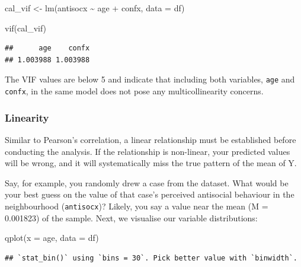\documentclass[
]{book}
\newenvironment{Shaded}{\begin{snugshade}}{\end{snugshade}}
\newcommand{\AttributeTok}[1]{\textcolor[rgb]{0.77,0.63,0.00}{#1}}
\newcommand{\FunctionTok}[1]{\textcolor[rgb]{0.00,0.00,0.00}{#1}}
\newcommand{\NormalTok}[1]{#1}
\newcommand{\OtherTok}[1]{\textcolor[rgb]{0.56,0.35,0.01}{#1}}
\newcommand{\SpecialCharTok}[1]{\textcolor[rgb]{0.00,0.00,0.00}{#1}}
\begin{document}
\begin{Shaded}
\begin{Highlighting}[]
\NormalTok{cal\_vif }\OtherTok{\textless{}{-}} \FunctionTok{lm}\NormalTok{(antisocx }\SpecialCharTok{\textasciitilde{}}\NormalTok{ age }\SpecialCharTok{+}\NormalTok{ confx, }\AttributeTok{data =}\NormalTok{ df) }

\FunctionTok{vif}\NormalTok{(cal\_vif)}
\end{Highlighting}
\end{Shaded}

\begin{verbatim}
##      age    confx 
## 1.003988 1.003988
\end{verbatim}

The VIF values are below 5 and indicate that including both variables, \texttt{age} and \texttt{confx}, in the same model does not pose any multicollinearity concerns.

\hypertarget{linearity}{%
\subsubsection{Linearity}\label{linearity}}

Similar to Pearson's correlation, a linear relationship must be established before conducting the analysis. If the relationship is non-linear, your predicted values will be wrong, and it will systematically miss the true pattern of the mean of Y.

Say, for example, you randomly drew a case from the dataset. What would be your best guess on the value of that case's perceived antisocial behaviour in the neighbourhood (\texttt{antisocx})? Likely, you say a value near the mean (M = 0.001823) of the sample. Next, we visualise our variable distributions:

\begin{Shaded}
\begin{Highlighting}[]
\FunctionTok{qplot}\NormalTok{(}\AttributeTok{x =}\NormalTok{ age, }\AttributeTok{data =}\NormalTok{ df)}
\end{Highlighting}
\end{Shaded}

\begin{verbatim}
## `stat_bin()` using `bins = 30`. Pick better value with `binwidth`.
\end{verbatim}
\end{document}
